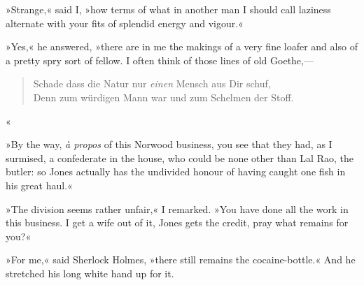 »Strange,« said I, »how terms of what in another man I should call laziness alternate with your fits of splendid energy and vigour.«

»Yes,« he answered, »there are in me the makings of a very fine loafer and also of a pretty spry sort of fellow. I often think of those lines of old Goethe,—
\begin{german}
\begin{verse}
Schade dass die Natur nur \textit{einen} Mensch aus Dir schuf,\\
Denn zum würdigen Mann war und zum Schelmen der Stoff.
\end{verse}
\end{german}«

»By the way, \textit{à propos} of this Norwood business, you see that they had, as I surmised, a confederate in the house, who could be none other than Lal Rao, the butler: so Jones actually has the undivided honour of having caught one fish in his great haul.«

»The division seems rather unfair,« I remarked. »You have done all the work in this business. I get a wife out of it, Jones gets the credit, pray what remains for you?«

»For me,« said Sherlock Holmes, »there still remains the cocaine-bottle.« And he stretched his long white hand up for it.